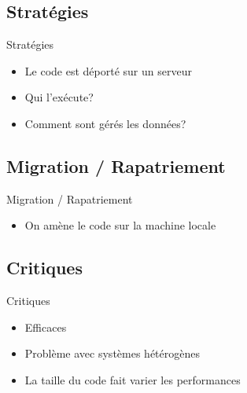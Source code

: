\section{\sectitle}
\begin{frame}{\sectitle}
    \def\subsectitle{Stratégies}
    \subsection{\subsectitle}
    \begin{block}{\subsectitle}
        \begin{itemize}
            \item Le code est déporté sur un serveur
            \item Qui l'exécute?
            \item Comment sont gérés les données?
        \end{itemize}
    \end{block}
\end{frame}
\begin{frame}{\sectitle}
    \def\subsectitle{Migration / Rapatriement}
    \subsection{\subsectitle}
    \begin{block}{\subsectitle}
        \begin{itemize}
            \item On amène le code sur la machine locale
        \end{itemize}
    \end{block}
    \def\subsectitle{Critiques}
    \subsection{\subsectitle}
    \begin{block}{\subsectitle}
        \begin{itemize}
            \item Efficaces
            \item Problème avec systèmes hétérogènes
            \item La taille du code fait varier les performances
        \end{itemize}
    \end{block}
\end{frame}

